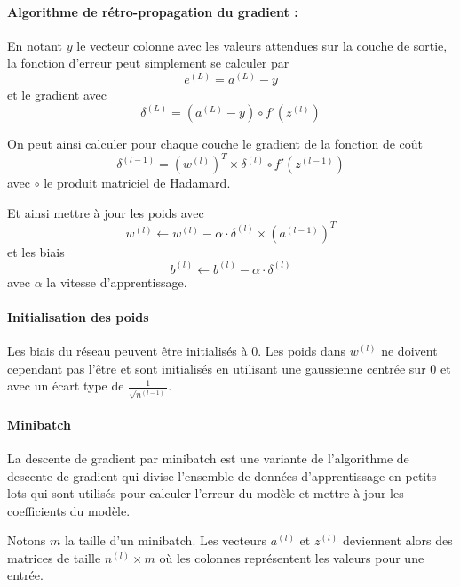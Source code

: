 \documentclass[11pt]{paper}
\begin{document}
\paragraph{Algorithme de rétro-propagation du gradient :}

En notant $y$ le vecteur colonne avec les valeurs attendues sur la couche de sortie, la fonction d'erreur peut simplement se calculer par $$e^{(L)} = a^{(L)} - y$$ et le gradient avec $$\delta^{(L)} = (a^{(L)} - y)  \circ f'(z^{(l)})$$

On peut ainsi calculer pour chaque couche le gradient de la fonction de coût $$\delta^{(l-1)} = (w^{(l)})^T \times \delta^{(l)} \circ f'(z^{(l-1)})$$ avec $\circ$ le produit matriciel de Hadamard.

Et ainsi mettre à jour les poids avec
$$w^{(l)} \leftarrow w^{(l)} - \alpha \cdot \delta^{(l)} \times (a^{(l-1)})^T$$
 et les biais 
 $$b^{(l)} \leftarrow b^{(l)} - \alpha \cdot \delta^{(l)}$$ avec $\alpha$ la vitesse d'apprentissage.

\paragraph{Initialisation des poids}

Les biais du réseau peuvent être initialisés à 0. Les poids dans $w^{(l)}$ ne doivent cependant pas l'être et sont initialisés en utilisant une gaussienne centrée sur 0 et avec un écart type de $\frac{1}{\sqrt{n^{(l-1)}}}$.


\paragraph{Minibatch}

La descente de gradient par minibatch est une variante de l'algorithme de descente de gradient qui divise l'ensemble de données d'apprentissage en petits lots qui sont utilisés pour calculer l'erreur du modèle et mettre à jour les coefficients du modèle.

Notons $m$ la taille d'un minibatch. Les vecteurs $a^{(l)}$ et $z^{(l)}$ deviennent alors des matrices de taille $n^{(l)} \times m$ où les colonnes représentent les valeurs pour une entrée.
\end{document}
